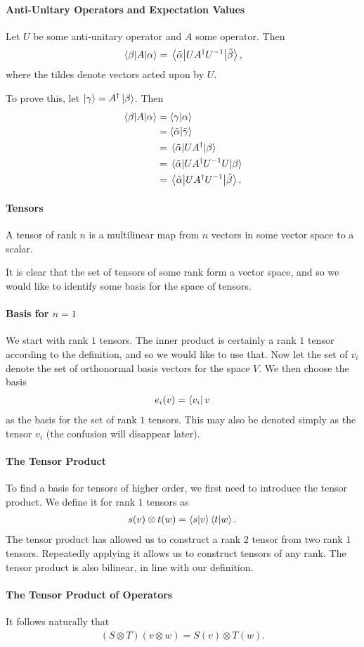 \paragraph{Anti-Unitary Operators and Expectation Values}
Let $U$ be some anti-unitary operator and $A$ some operator. Then
\begin{align*}
	\mel{\beta}{A}{\alpha} = \mel{\tilde{\alpha}}{UA^{\dagger}U^{-1}}{\tilde{\beta}},
\end{align*}
where the tildes denote vectors acted upon by $U$.

To prove this, let $\ket{\gamma} = A^{\dagger}\ket{\beta}$. Then
\begin{align*}
	\mel{\beta}{A}{\alpha} &= \braket{\gamma}{\alpha} \\
	                       &= \braket{\tilde{\alpha}}{\tilde{\gamma}} \\
	                       &= \mel{\tilde{\alpha}}{UA^{\dagger}}{\beta} \\
	                       &= \mel{\tilde{\alpha}}{UA^{\dagger}U^{-1}U}{\beta} \\
	                       &= \mel{\tilde{\alpha}}{UA^{\dagger}U^{-1}}{\tilde{\beta}}.
\end{align*}

\paragraph{Tensors}
A tensor of rank $n$ is a multilinear map from $n$ vectors in some vector space to a scalar.

It is clear that the set of tensors of some rank form a vector space, and so we would like to identify some basis for the space of tensors.

\paragraph{Basis for $n = 1$}
We start with rank $1$ tensors. The inner product is certainly a rank $1$ tensor according to the definition, and so we would like to use that. Now let the set of $v_{i}$ denote the set of orthonormal basis vectors for the space $V$. We then choose the basis
\begin{align*}
	e_{i}(v) = \bra{v_{i}}{v}
\end{align*}
as the basis for the set of rank $1$ tensors. This may also be denoted simply as the tensor $v_{i}$ (the confusion will disappear later).

\paragraph{The Tensor Product}
To find a basis for tensors of higher order, we first need to introduce the tensor product. We define it for rank $1$ tensors as
\begin{align*}
	s(v)\otimes t(w) = \braket{s}{v}\braket{t}{w}.
\end{align*}
The tensor product has allowed us to construct a rank $2$ tensor from two rank $1$ tensors. Repeatedly applying it allows us to construct tensors of any rank. The tensor product is also bilinear, in line with our definition.

\paragraph{The Tensor Product of Operators}
It follows naturally that
\begin{align*}
	(S\otimes T)(v\otimes w) = S(v)\otimes T(w).
\end{align*}